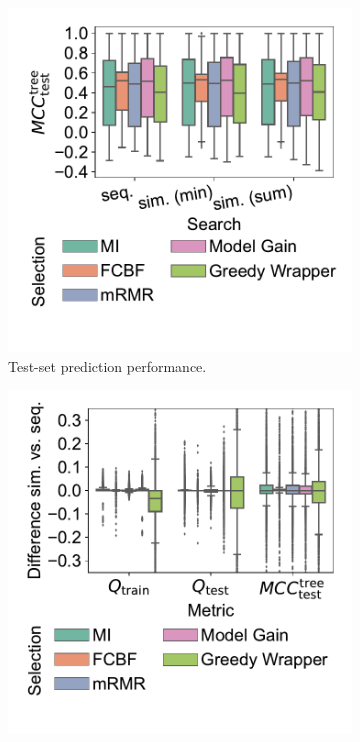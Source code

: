 \documentclass{article}
\theoremstyle{definition}
\begin{document}
\begin{figure}[htb]
	\centering
	\begin{subfigure}[t]{0.48\textwidth}
		\centering
		\includegraphics[width=\textwidth, trim=15 40 15 10, clip]{plots/impact-search-fs-method-decision-tree-test-mcc.pdf}
		\caption{Test-set prediction performance.}
		\label{fig:afs:impact-search-fs-method-decision-tree-test-mcc}
	\end{subfigure}
	\hfill
	\begin{subfigure}[t]{0.48\textwidth}
		\centering
		\includegraphics[width=\textwidth, trim=15 40 15 10, clip]{plots/impact-search-fs-method-metric-diff.pdf}

\end{subfigure}
\end{figure}
\end{document}
